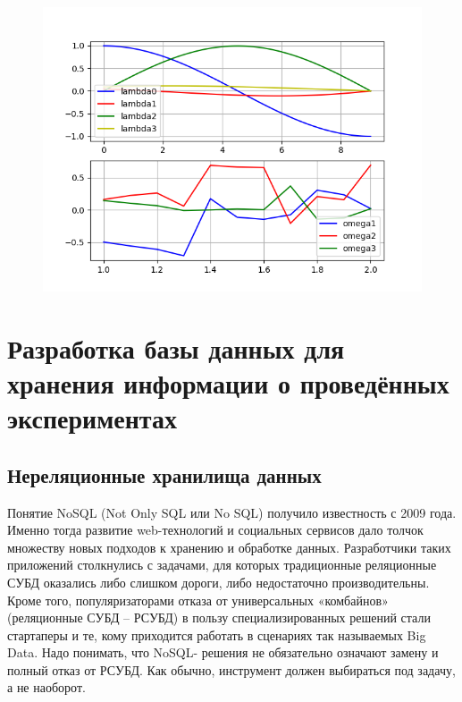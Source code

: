 \documentclass[14pt]{extreport}
\begin{document}
\begin{figure}[H]
\center\includegraphics[scale=0.7]{fig/ivp_and_control_alpha2_1-2_5.png}
\caption{}
\end{figure}

\chapter{Разработка базы данных для хранения информации о проведённых экспериментах}
\section{Нереляционные хранилища данных}
Понятие NoSQL (Not Only SQL или No SQL) получило известность с 2009 года. Именно тогда развитие web-технологий и социальных сервисов дало толчок множеству новых подходов к хранению и обработке данных. Разработчики таких приложений столкнулись с задачами, для которых традиционные реляционные СУБД оказались либо слишком дороги, либо недостаточно производительны. Кроме того, популяризаторами отказа от универсальных «комбайнов» (реляционные СУБД – РСУБД) в пользу специализированных решений стали стартаперы и те, кому приходится работать в сценариях так называемых Big Data. Надо понимать, что NoSQL- решения не обязательно означают замену и полный отказ от РСУБД. Как обычно, инструмент должен выбираться под задачу, а не наоборот.
\end{document}
